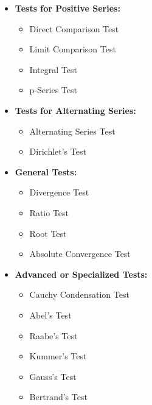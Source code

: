 \documentclass[a4paper,11pt]{article}
\begin{document}
\begin{tcolorbox}
    \begin{itemize}
        \item \textbf{Tests for Positive Series:}
        \begin{multicols}{2}
            \begin{itemize}[label=$\circ$]
                \item Direct Comparison Test
                \item Limit Comparison Test
                \item Integral Test %
                \item p-Series Test
            \end{itemize}
        \end{multicols}
        \item \textbf{Tests for Alternating Series:}
        \begin{multicols}{2}
            \begin{itemize}[label=$\circ$]
                \item Alternating Series Test %
                \item Dirichlet’s Test
            \end{itemize}
        \end{multicols}
        \item \textbf{General Tests:}
        \begin{multicols}{2}
            \begin{itemize}[label=$\circ$]
                \item Divergence Test %
                \item Ratio Test %
                \item Root Test %
                \item Absolute Convergence Test
            \end{itemize}
        \end{multicols}
        \item \textbf{Advanced or Specialized Tests:}
        \begin{multicols}{2}
            \begin{itemize}[label=$\circ$]
                \item Cauchy Condensation Test
                \item Abel's Test 
                \item Raabe's Test
                \item Kummer's Test
                \item Gauss's Test
                \item Bertrand's Test
            \end{itemize}
        \end{multicols}
    \end{itemize}
\end{tcolorbox}
\end{document}
